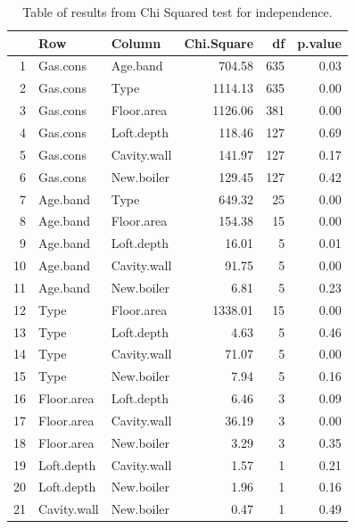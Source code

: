 \documentclass[11pt]{article}
\begin{document}
\begin{table}[H]
	\centering
	\begin{tabular}{rllrrr}
		\hline
		& Row & Column & Chi.Square & df & p.value \\ 
		\hline
		1 & Gas.cons & Age.band & 704.58 & 635 & 0.03 \\ 
		2 & Gas.cons & Type & 1114.13 & 635 & 0.00 \\ 
		3 & Gas.cons & Floor.area & 1126.06 & 381 & 0.00 \\ 
		4 & Gas.cons & Loft.depth & 118.46 & 127 & 0.69 \\ 
		5 & Gas.cons & Cavity.wall & 141.97 & 127 & 0.17 \\ 
		6 & Gas.cons & New.boiler & 129.45 & 127 & 0.42 \\ 
		7 & Age.band & Type & 649.32 &  25 & 0.00 \\ 
		8 & Age.band & Floor.area & 154.38 &  15 & 0.00 \\ 
		9 & Age.band & Loft.depth & 16.01 &   5 & 0.01 \\ 
		10 & Age.band & Cavity.wall & 91.75 &   5 & 0.00 \\ 
		11 & Age.band & New.boiler & 6.81 &   5 & 0.23 \\ 
		12 & Type & Floor.area & 1338.01 &  15 & 0.00 \\ 
		13 & Type & Loft.depth & 4.63 &   5 & 0.46 \\ 
		14 & Type & Cavity.wall & 71.07 &   5 & 0.00 \\ 
		15 & Type & New.boiler & 7.94 &   5 & 0.16 \\ 
		16 & Floor.area & Loft.depth & 6.46 &   3 & 0.09 \\ 
		17 & Floor.area & Cavity.wall & 36.19 &   3 & 0.00 \\ 
		18 & Floor.area & New.boiler & 3.29 &   3 & 0.35 \\ 
		19 & Loft.depth & Cavity.wall & 1.57 &   1 & 0.21 \\ 
		20 & Loft.depth & New.boiler & 1.96 &   1 & 0.16 \\ 
		21 & Cavity.wall & New.boiler & 0.47 &   1 & 0.49 \\ 
		\hline
	\end{tabular}
\caption{Table of results from Chi Squared test for independence.}
\label{tab:chi}
\end{table}
\end{document}
